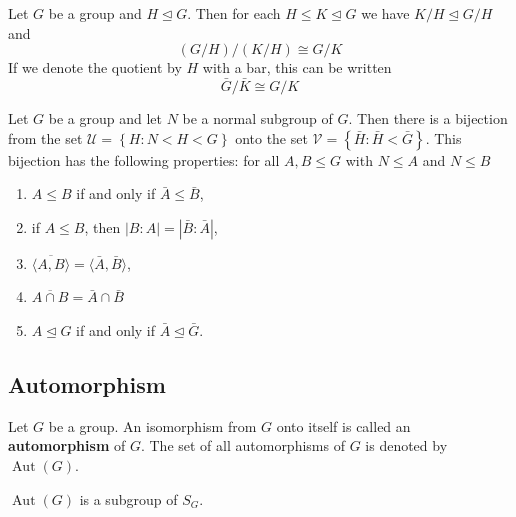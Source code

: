 \begin{theorem}
    Let $G$ be a group and $H \unlhd G$. Then for each $H\leq K \unlhd G$ we have $K / H \unlhd G / H$ and
    \begin{equation*}
        (G / H) /(K / H) \cong G / K
    \end{equation*}
    If we denote the quotient by $H$ with a bar, this can be written
    \begin{equation*}
        \bar{G }/ \bar{K} \cong G / K
    \end{equation*}

\end{theorem}

\begin{theorem}
    Let $G$ be a group and let $N$ be a normal subgroup of $G$. Then there is a bijection from the set $\mathcal{U}=\left\{H: N<H<G\right\}$ onto the set $\mathcal{V}=\left\{\bar{H}:\bar{H}<\bar{G}\right\}$.
    This bijection has the following properties: for all $A, B \leq G$ with $N \leq A$ and $N \leq B$
    \begin{enumerate}
        \item
              $A \leq B$ if and only if $\bar{A} \leq \bar{B}$,

        \item
              if $A \leq B$, then $|B: A|=|\bar{B}: \bar{A}|$,

        \item
              $\overline{\langle A, B\rangle}=\langle\bar{A}, \bar{B}\rangle$,
        \item
              $\overline{A \cap B}=\bar{A} \cap \bar{B}$
        \item
              $A \unlhd G$ if and only if $\bar{A} \unlhd \bar{G}$.
    \end{enumerate}
\end{theorem}

\subsection{Automorphism}
\begin{definition}
    Let $G$ be a group. An isomorphism from $G$ onto itself is called an \textbf{automorphism} of $G$. The set of all automorphisms of $G$ is denoted by $\operatorname{Aut}(G)$.

    $\operatorname{Aut}(G)$ is a subgroup of $S_G$.
\end{definition}


